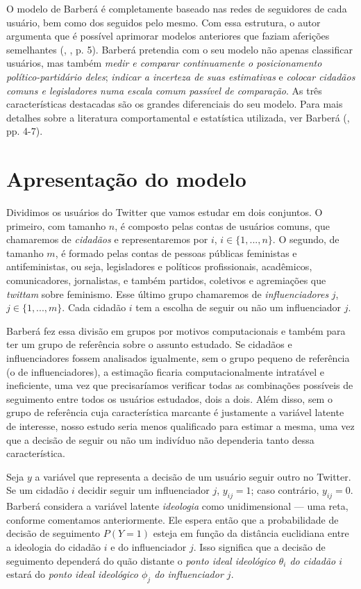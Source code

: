 \documentclass[
	12pt,				%
	openright,			%
	twoside,			%
	a4paper,			%
	english,			%
	brazil				%
	]{abntex2}
\begin{document}
 O modelo de Barberá é completamente baseado nas redes de seguidores de cada usuário, bem como dos seguidos pelo mesmo. Com essa estrutura, o autor argumenta que é possível aprimorar modelos anteriores que faziam aferições semelhantes (, \citeyear{barbera2015}, p. 5). Barberá pretendia com o seu modelo não apenas classificar usuários, mas também \emph{medir e comparar continuamente o posicionamento político-partidário deles}; \emph{indicar a incerteza de suas estimativas} e \emph{colocar cidadãos comuns e legisladores numa escala comum passível de comparação}. As três características destacadas são os grandes diferenciais do seu modelo. Para mais detalhes sobre a literatura comportamental e estatística utilizada, ver Barberá (\citeyear{barbera2015}, pp. 4-7).
 
 \section{Apresentação do modelo}
 Dividimos os usuários do Twitter que vamos estudar em dois conjuntos. O primeiro, com tamanho $n$, é composto pelas contas de usuários comuns, que chamaremos de \emph{cidadãos} e representaremos por $i$, $i \in \{1, ..., n\}$. O segundo, de tamanho $m$, é formado pelas contas de pessoas públicas feministas e antifeministas, ou seja, legisladores e políticos profissionais, acadêmicos, comunicadores, jornalistas, e também partidos, coletivos e agremiações que \textit{twittam} sobre feminismo. Esse último grupo chamaremos de \emph{influenciadores} $j$, $j \in \{1, ..., m\}$. Cada cidadão $i$ tem a escolha de seguir ou não um influenciador $j$.

 Barberá fez essa divisão em grupos por motivos computacionais e também para ter um grupo de referência sobre o assunto estudado. Se cidadãos e influenciadores fossem analisados igualmente, sem o grupo pequeno de referência (o de influenciadores), a estimação ficaria computacionalmente intratável e ineficiente, uma vez que precisaríamos verificar todas as combinações possíveis de seguimento entre todos os usuários estudados, dois a dois. Além disso, sem o grupo de referência cuja característica marcante é justamente a variável latente de interesse, nosso estudo seria menos qualificado para estimar a mesma, uma vez que a decisão de seguir ou não um indivíduo não dependeria tanto dessa característica.
 
 Seja $y$ a variável que representa a decisão de um usuário seguir outro no Twitter. Se um cidadão $i$ decidir seguir um influenciador $j$, $y_{ij} = 1$; caso contrário, $y_{ij} = 0$. Barberá considera a variável latente \emph{ideologia} como unidimensional --- uma reta, conforme comentamos anteriormente. Ele espera então que a probabilidade de decisão de seguimento $P(Y=1)$ esteja em função da distância euclidiana entre a ideologia do cidadão $i$ e do influenciador $j$. Isso significa que a decisão de seguimento dependerá do quão distante o \emph{ponto ideal ideológico $\theta_{i}$ do cidadão $i$} estará do \emph{ponto ideal ideológico $\phi_{j}$ do influenciador $j$}.
 
\end{document}
